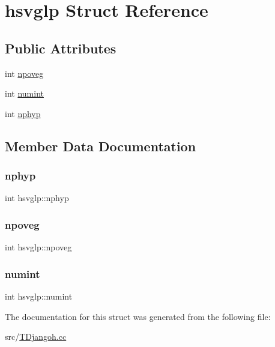 \hypertarget{structhsvglp}{}\section{hsvglp Struct Reference}
\label{structhsvglp}
\subsection*{Public Attributes}
\begin{DoxyCompactItemize}
\item 
int \hyperlink{structhsvglp_a3aa968f95f375ec1988d889377f934a5}{npoveg}
\item 
int \hyperlink{structhsvglp_a77f117ab2d6a541371b5939a7a97e8c5}{numint}
\item 
int \hyperlink{structhsvglp_ab9a7d811f6599ee8b9e0ed65fe81ce9e}{nphyp}
\end{DoxyCompactItemize}


\subsection{Member Data Documentation}
\mbox{\label{structhsvglp_ab9a7d811f6599ee8b9e0ed65fe81ce9e}} 
\subsubsection{\texorpdfstring{nphyp}{nphyp}}
{\footnotesize\ttfamily int hsvglp\+::nphyp}

\mbox{\label{structhsvglp_a3aa968f95f375ec1988d889377f934a5}} 
\subsubsection{\texorpdfstring{npoveg}{npoveg}}
{\footnotesize\ttfamily int hsvglp\+::npoveg}

\mbox{\label{structhsvglp_a77f117ab2d6a541371b5939a7a97e8c5}} 
\subsubsection{\texorpdfstring{numint}{numint}}
{\footnotesize\ttfamily int hsvglp\+::numint}



The documentation for this struct was generated from the following file\+:\begin{DoxyCompactItemize}
\item 
src/\hyperlink{_t_djangoh_8cc}{T\+Djangoh.\+cc}\end{DoxyCompactItemize}

